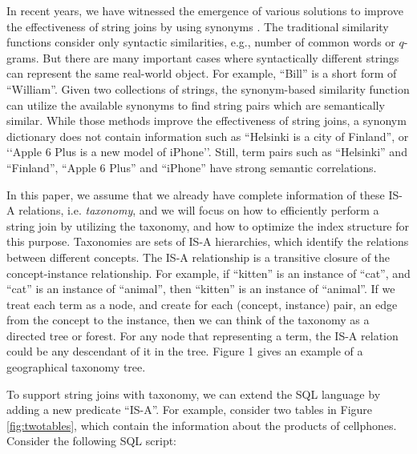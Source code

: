 In recent years, we have witnessed the emergence of various solutions to improve the effectiveness of string joins by using synonyms \cite{conf/sigmod/LuLWLW13,conf/icde/ArasuCK08,conf/cpm/BarbayGMR06,conf/vldb/ArvindSR09}.
The traditional similarity functions consider only syntactic similarities, e.g., number of common
words or $q$-grams. But there are many important cases where syntactically different
strings can represent the same real-world object. For example,
``\textsf{Bill}'' is a short form of ``\textsf{William}''.  Given two collections of strings,  the synonym-based similarity function can utilize the available synonyms to find string pairs which are semantically similar. While those methods improve the effectiveness of string joins, a synonym dictionary does not contain information such as
``\textsf{Helsinki is a city of Finland}'', or `\textsf{`Apple 6 Plus is a new model of iPhone}''. Still, term pairs such as ``\textsf{Helsinki}'' and ``\textsf{Finland}'', ``\textsf{Apple 6 Plus}'' and ``\textsf{iPhone}''  have strong semantic correlations.


In this paper, we assume that we already have complete
information of these IS-A relations, i.e. \textit{taxonomy}, and we will focus on how
to efficiently perform a string join by utilizing the taxonomy, and how to optimize the index structure
for this purpose.  Taxonomies are sets of IS-A hierarchies, which identify the relations between different concepts. The IS-A relationship
is a transitive closure of the concept-instance relationship.
For example, if ``\textsf{kitten}'' is an instance of ``\textsf{cat}'', and
``\textsf{cat}'' is an instance of ``\textsf{animal}'', then ``\textsf{kitten}'' is an instance
of ``\textsf{animal}''. If we treat each term as a node, and create
for each (concept, instance) pair, an edge from the concept
to the instance, then we can think of the taxonomy as a directed tree or forest. For any node that representing a term,
the IS-A relation could be any descendant of it in the tree. Figure
1 gives an example of a geographical taxonomy tree.




To support string joins with taxonomy, we can extend the SQL language by adding a new predicate ``IS-A''. For example,
consider two tables in Figure \ref{fig:twotables}, which contain the information about the products of cellphones.  Consider the following SQL script:

